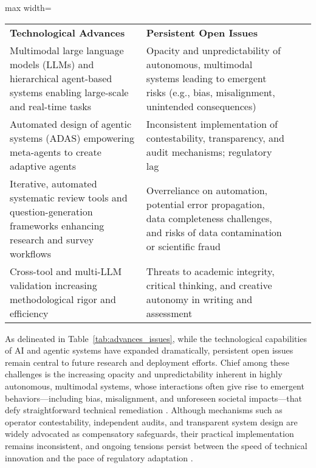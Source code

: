 \documentclass[sigconf]{acmart}
\begin{document}
\begin{table*}[htbp]
\centering
\caption{Key Technological Advances and Persistent Open Issues in AI and Agentic Systems}
\label{tab:advances_issues}
\begin{adjustbox}{max width=\textwidth}
\begin{tabular}{@{}llll@{}}
\toprule
\textbf{Technological Advances} & \textbf{Persistent Open Issues} &  &  \\
Multimodal large language models (LLMs) and hierarchical agent-based systems enabling large-scale and real-time tasks & Opacity and unpredictability of autonomous, multimodal systems leading to emergent risks (e.g., bias, misalignment, unintended consequences) &  &  \\
Automated design of agentic systems (ADAS) empowering meta-agents to create adaptive agents & Inconsistent implementation of contestability, transparency, and audit mechanisms; regulatory lag &  &  \\
Iterative, automated systematic review tools and question-generation frameworks enhancing research and survey workflows & Overreliance on automation, potential error propagation, data completeness challenges, and risks of data contamination or scientific fraud &  &  \\
Cross-tool and multi-LLM validation increasing methodological rigor and efficiency & Threats to academic integrity, critical thinking, and creative autonomy in writing and assessment &  &  \\
\bottomrule
\end{tabular}
\end{adjustbox}
\end{table*}

As delineated in Table~\ref{tab:advances_issues}, while the technological capabilities of AI and agentic systems have expanded dramatically, persistent open issues remain central to future research and deployment efforts. Chief among these challenges is the increasing opacity and unpredictability inherent in highly autonomous, multimodal systems, whose interactions often give rise to emergent behaviors—including bias, misalignment, and unforeseen societal impacts—that defy straightforward technical remediation \cite{ref95,ref96,ref100,ref110}. Although mechanisms such as operator contestability, independent audits, and transparent system design are widely advocated as compensatory safeguards, their practical implementation remains inconsistent, and ongoing tensions persist between the speed of technical innovation and the pace of regulatory adaptation \cite{ref97,ref98,ref100,ref106}.
\end{document}
